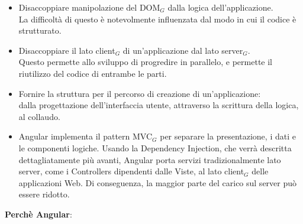 \begin{itemize}
	\item Disaccoppiare manipolazione del DOM$_G$ dalla logica dell'applicazione.\\
	La difficoltà di questo è notevolmente influenzata dal modo in cui il codice è strutturato.
	\item Disaccoppiare il lato client$_G$  di un'applicazione dal lato server$_G$.\\
	Questo permette allo sviluppo di progredire in parallelo, e permette il riutilizzo del codice di entrambe le parti.
	\item Fornire la struttura per il percorso di creazione di un'applicazione:\\
	dalla progettazione dell'interfaccia utente, attraverso la scrittura della logica, al collaudo.
	\item Angular implementa il pattern MVC$_G$ per separare la presentazione, i dati e le componenti logiche. Usando la Dependency Injection, che verrà descritta dettagliatamente più avanti, Angular porta servizi  tradizionalmente lato server, come i Controllers dipendenti dalle Viste, al lato client$_G$ delle applicazioni Web. Di conseguenza, la maggior parte del carico sul server può essere ridotto.
\end{itemize}
\textbf{Perchè Angular}:

